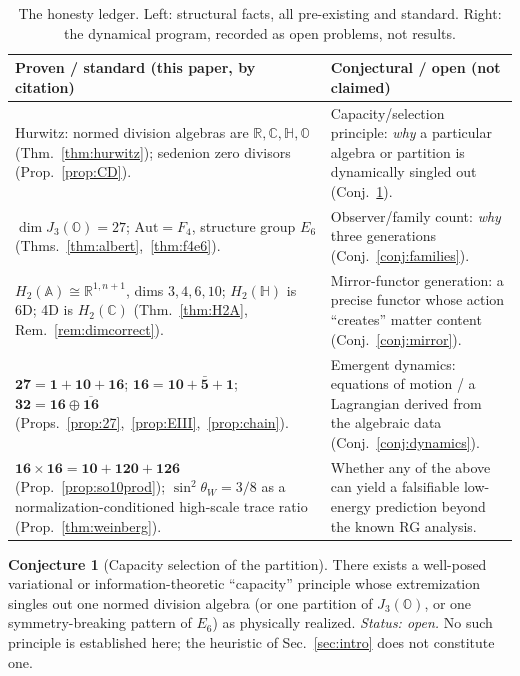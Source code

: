 \documentclass[aps,prresearch,onecolumn,amsmath,amssymb,nofootinbib]{revtex4-2}
\theoremstyle{plain}\newtheorem{theorem}{Theorem}[section]\newtheorem{proposition}[theorem]{Proposition}\newtheorem{lemma}[theorem]{Lemma}\newtheorem{corollary}[theorem]{Corollary}
\theoremstyle{definition}\newtheorem{definition}[theorem]{Definition}\newtheorem{conjecture}[theorem]{Conjecture}
\theoremstyle{remark}\newtheorem{remark}[theorem]{Remark}
\begin{document}
\begin{table}[h]
\centering
\begin{tabular}{p{} p{}}
\toprule
\textbf{Proven / standard (this paper, by citation)} & \textbf{Conjectural / open (not claimed)}\\
\midrule
Hurwitz: normed division algebras are $\mathbb{R},\mathbb{C},\mathbb{H},\mathbb{O}$ (Thm.~\ref{thm:hurwitz}); sedenion zero divisors (Prop.~\ref{prop:CD}).
& Capacity/selection principle: \emph{why} a particular algebra or partition is dynamically singled out (Conj.~\ref{conj:capacity}).\\[2pt]
$\dim J_3(\mathbb{O})=27$; $\mathrm{Aut}=F_4$, structure group $E_6$ (Thms.~\ref{thm:albert},~\ref{thm:f4e6}).
& Observer/family count: \emph{why} three generations (Conj.~\ref{conj:families}).\\[2pt]
$H_2(\mathbb{A})\cong\mathbb{R}^{1,n+1}$, dims $3,4,6,10$; $H_2(\mathbb{H})$ is 6D; 4D is $H_2(\mathbb{C})$ (Thm.~\ref{thm:H2A}, Rem.~\ref{rem:dimcorrect}).
& Mirror-functor generation: a precise functor whose action ``creates'' matter content (Conj.~\ref{conj:mirror}).\\[2pt]
$\mathbf{27}=\mathbf{1}+\mathbf{10}+\mathbf{16}$; $\mathbf{16}=\mathbf{10}+\bar{\mathbf5}+\mathbf1$; $\mathbf{32}=\mathbf{16}\oplus\overline{\mathbf{16}}$ (Props.~\ref{prop:27},~\ref{prop:EIII},~\ref{prop:chain}).
& Emergent dynamics: equations of motion / a Lagrangian derived from the algebraic data (Conj.~\ref{conj:dynamics}).\\[2pt]
$\mathbf{16}\times\mathbf{16}=\mathbf{10}+\mathbf{120}+\mathbf{126}$ (Prop.~\ref{prop:so10prod}); $\sin^2\theta_W=3/8$ as a normalization-conditioned high-scale trace ratio (Prop.~\ref{thm:weinberg}).
& Whether any of the above can yield a falsifiable low-energy prediction beyond the known RG analysis.\\
\bottomrule
\end{tabular}
\caption{The honesty ledger. Left: structural facts, all pre-existing and standard. Right: the dynamical program, recorded as open problems, not results.}
\label{tab:ledger}
\end{table}

\begin{conjecture}[Capacity selection of the partition]
\label{conj:capacity}
There exists a well-posed variational or information-theoretic ``capacity'' principle whose extremization singles out one normed division algebra (or one partition of $J_3(\mathbb{O})$, or one symmetry-breaking pattern of $E_6$) as physically realized. \emph{Status: open.} No such principle is established here; the heuristic of Sec.~\ref{sec:intro} does not constitute one.
\end{conjecture}
\end{document}
